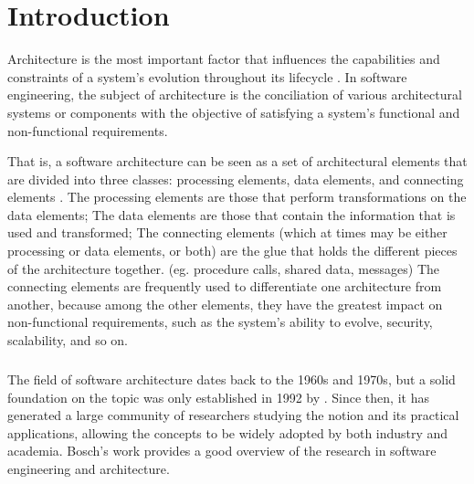 
%

\chapter{Introduction}
\label{cha:introduction}

Architecture is the most important factor that influences the capabilities and constraints of a system's evolution throughout its lifecycle \cite{Breivold2012}.
In software engineering, the subject of architecture is the conciliation of various architectural systems or components
with the objective of satisfying a system's functional and non-functional requirements.

That is, a software architecture can be seen as a set of architectural elements that are divided into three classes: processing elements, data elements, and connecting elements \cite{architecture}.
The processing elements are those that perform transformations on the data elements;
The data elements are those that contain the information that is used and transformed;
The connecting elements (which at times may be either processing or data elements, or both) are the glue that holds the different pieces of the architecture together.
(eg. procedure calls, shared data, messages)
The connecting elements are frequently used to differentiate one architecture from another,
because among the other elements, they have the greatest impact on non-functional requirements, such as the system's ability to evolve, security, scalability, and so on.

\paragraph{}

The field of software architecture dates back to the 1960s and 1970s, but a solid foundation on the topic was only established in 1992 by \citeauthor{architecture} \cite{architecture}.
Since then, it has generated a large community of researchers studying the notion and its practical applications,
allowing the concepts to be widely adopted by both industry and academia.
Bosch's work \cite{3, 4} provides a good overview of the research in software engineering and architecture.

